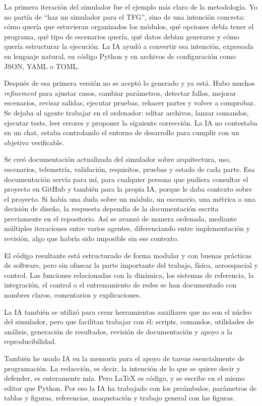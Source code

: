 La primera iteración del simulador fue el ejemplo más claro de la metodología. Yo no partía de
``haz un simulador para el TFG'', sino de una intención concreta: cómo quería que
estuvieran organizados los módulos, qué opciones debía tener el programa, qué
tipo de escenarios quería, qué datos debían generarse y cómo quería estructurar
la ejecución. La IA ayudó a convertir esa intención, expresada en lenguaje
natural, en código Python y en archivos de configuración como JSON,
YAML o TOML.

Después de esa primera versión no se aceptó lo generado y ya está. Hubo muchos
\textit{refinement} para ajustar casos, cambiar parámetros, detectar fallos,
mejorar escenarios, revisar salidas, ejecutar pruebas, rehacer partes y volver a
comprobar. Se dejaba al agente trabajar en el ordenador: editar archivos,
lanzar comandos, ejecutar tests, leer errores y proponer la siguiente corrección.
La IA no contestaba en un chat, estaba controlando el entorno de desarrollo para cumplir
con un objetivo verificable.

Se creó documentación actualizada del simulador sobre arquitectura, uso, escenarios,
telemetría, validación, requisitos, pruebas y estado de cada parte. Esa
documentación servía para mí, para cualquier persona que pudiera consultar el
proyecto en GitHub y también para la propia IA, porque le daba contexto sobre el
proyecto. Si había una duda sobre un módulo, un escenario, una métrica o una
decisión de diseño, la respuesta dependía de la documentación escrita previamente
en el repositorio. Así se avanzó de manera ordenada, mediante múltiples iteraciones entre varios agentes, diferenciando entre implementación y revisión, algo que habría sido imposible sin ese contexto.

El código resultante está estructurado de forma modular y con buenas prácticas de
software, pero sin ofuscar la parte importante del trabajo, física, aeroespacial y
control. Las funciones relacionadas con la dinámica, los sistemas de referencia, la
integración, el control o el entrenamiento de redes se han documentado con nombres
claros, comentarios y explicaciones.

La IA también se utilizó para crear herramientas auxiliares que no son el núcleo
del simulador, pero que facilitan trabajar con él: scripts, comandos, utilidades
de análisis, generación de resultados, revisión de documentación y apoyo a la
reproducibilidad.

También he usado IA en la memoria para el apoyo de tareas esencialmente de programación.
La redacción, es decir, la intención de lo que se quiere decir y defender, es enteramente
mía. Pero LaTeX es código, y se escribe en el mismo editor que Python. Por eso la IA ha
trabajado con los preámbulos, parámetros de tablas y figuras, referencias, maquetación y
trabajo general con las figuras.

